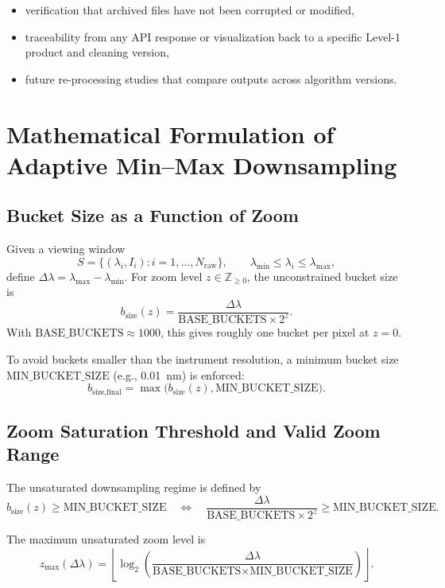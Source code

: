 \documentclass[12pt,a4paper]{article}
\begin{document}
\begin{itemize}[nosep]
  \item verification that archived files have not been corrupted or modified,
  \item traceability from any API response or visualization back to a specific Level-1 product and cleaning version,
  \item future re-processing studies that compare outputs across algorithm versions.
\end{itemize}

\section{Mathematical Formulation of Adaptive Min--Max Downsampling}
\label{sec:math}

\subsection{Bucket Size as a Function of Zoom}

Given a viewing window
\[
S = \{(\lambda_i, I_i): i=1,\ldots,N_{\text{raw}}\},\qquad
\lambda_{\min} \le \lambda_i \le \lambda_{\max},
\]
define \(\Delta\lambda = \lambda_{\max} - \lambda_{\min}\). For zoom level \(z\in\mathbb{Z}_{\ge 0}\), the unconstrained bucket size is
\[
b_{\text{size}}(z) = \frac{\Delta\lambda}{\text{BASE\_BUCKETS}\times 2^z}. \tag{4}
\]
With \(\text{BASE\_BUCKETS}\approx 1000\), this gives roughly one bucket per pixel at \(z=0\).

To avoid buckets smaller than the instrument resolution, a minimum bucket size \(\text{MIN\_BUCKET\_SIZE}\) (e.g., \SI{0.01}{nm}) is enforced:
\[
b_{\text{size,final}} = \max\bigl(b_{\text{size}}(z), \text{MIN\_BUCKET\_SIZE}\bigr). \tag{5}
\]

\subsection{Zoom Saturation Threshold and Valid Zoom Range}

The unsaturated downsampling regime is defined by
\[
b_{\text{size}}(z) \ge \text{MIN\_BUCKET\_SIZE}
\quad\Longleftrightarrow\quad
\frac{\Delta\lambda}{\text{BASE\_BUCKETS}\times 2^z} \ge \text{MIN\_BUCKET\_SIZE}. \tag{6}
\]

The maximum unsaturated zoom level is
\[
z_{\max}(\Delta\lambda) = \left\lfloor
\log_2\left(\frac{\Delta\lambda}{\text{BASE\_BUCKETS}\times \text{MIN\_BUCKET\_SIZE}}\right)
\right\rfloor. \tag{7}
\]
\end{document}
